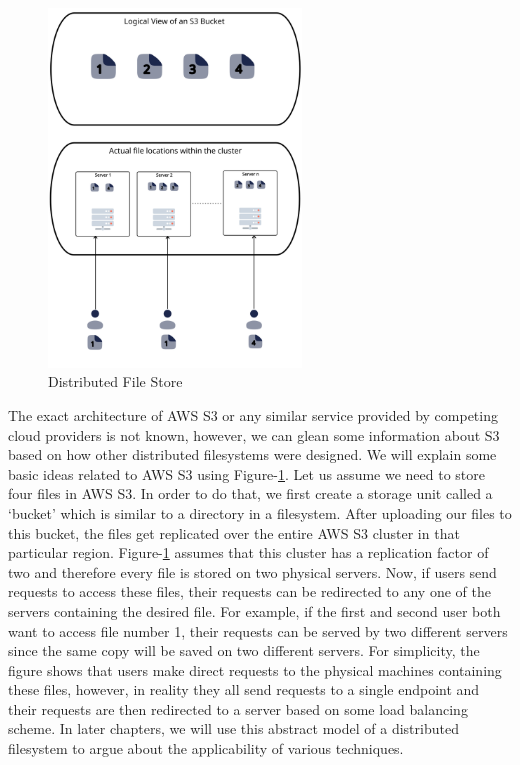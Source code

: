 \begin{figure}[ht]
    \centering
    \includegraphics[width=0.6\textwidth]{figures/distributedCloudStorage.png}
    \caption{Distributed File Store}
    \label{fig:distFileStore}
\end{figure}

\medskip
The exact architecture of AWS S3 or any similar service provided by
competing cloud providers is not known, however, we can glean some information
about S3 based on
how other distributed filesystems were designed. We will explain some basic ideas
related to AWS S3 using Figure-\ref{fig:distFileStore}. Let us assume we need to
store four files in AWS S3. In order to do that, we first create a storage unit
called a `bucket' which is similar to a directory in a filesystem. After
uploading our files to this bucket, the files get replicated over the entire AWS S3 cluster in
that particular region. Figure-\ref{fig:distFileStore} assumes that this cluster
has a replication factor of two and therefore every file is stored on two
physical servers. Now, if users send requests to access these files, their
requests can be redirected to any one of the servers containing the desired file. For
example, if the first and second user both want to access file number 1, their
requests can be served by two different servers since the same copy will be
saved on two different servers. For simplicity, the figure shows that users make
direct requests to the physical machines containing these files, however, in
reality they all send requests to a single endpoint and their requests are then
redirected to a server based on some load balancing scheme. In later chapters,
we will use this abstract model of a distributed filesystem to argue about the
applicability of various techniques.

